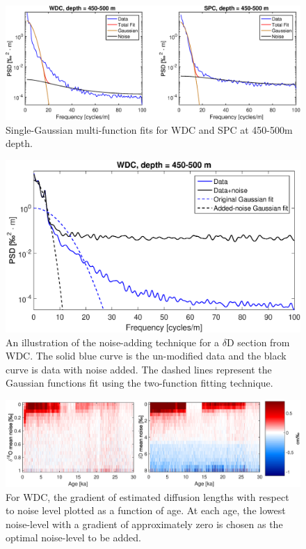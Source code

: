 \documentclass[draft, jgrga]{AGUTeX}
\begin{document}
\begin{figure}
	\includegraphics[width=\linewidth]{GR_fits.eps}
	\caption{Single-Gaussian multi-function fits for WDC and SPC at 450-500m depth.} \label{GR_fits}
\end{figure}

\begin{figure}
	\includegraphics[width=.9\linewidth]{WAIS_spectrum_added_noise.eps}
	\caption{An illustration of the noise-adding technique for a $\delta$D section from WDC. The solid blue curve is the un-modified data and the black curve is data with noise added. The dashed lines represent the Gaussian functions fit using the two-function fitting technique.} \label{WAIS_spectrum_added_noise}
\end{figure}

\begin{figure}
	\includegraphics[width=\linewidth]{added_noise_sensitivity.eps}
	\caption{For WDC, the gradient of estimated diffusion lengths with respect to noise level plotted as a function of age. At each age, the lowest noise-level with a gradient of approximately zero is chosen as the optimal noise-level to be added.} \label{added_noise_sensitivity}
\end{figure}
\end{document}
